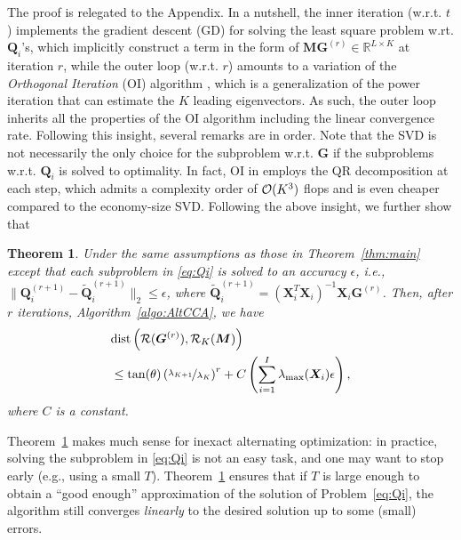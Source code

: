 \documentclass[10pt,journal]{IEEEtran}
\newtheorem{Theorem}{Theorem}
\newtheorem{Remark}{Remark}
\newcommand{\G}{\boldsymbol{G}}
\newcommand{\Q}{\boldsymbol{Q}}
\newcommand{\X}{\boldsymbol{X}}
\begin{document}
The proof is relegated to the Appendix. In a nutshell, the inner iteration (w.r.t. $t$) implements the gradient descent (GD) for solving the least square problem w.rt. $\Q_i$'s, which implicitly construct a term in the form of ${\bm M}{\bm G}^{(r)}\in\mathbb{R}^{L\times K}$ at iteration $r$, while the outer loop (w.r.t. $r$) amounts to a variation of the \emph{Orthogonal Iteration} (OI) algorithm  \cite{GHGolub1996}, which is a generalization of the power iteration that can estimate the $K$ leading eigenvectors.
As such, the outer loop inherits all the properties of the OI algorithm including the linear convergence rate. Following this insight, several remarks are in order.
Note that the SVD is not necessarily the only choice for the subproblem w.r.t. ${\bm G}$ if the subproblems w.r.t. ${\bm Q}_i$ is solved to optimality. In fact, OI in \cite{GHGolub1996} employs the QR decomposition at each step, which admits a complexity order of ${\cal O}(K^3)$ flops and is even cheaper compared to the economy-size SVD.
Following the above insight, we further show that
\begin{Theorem} \label{thm:main_2}
Under the same assumptions as those in Theorem~\ref{thm:main} except that each subproblem in \eqref{eq:Qi} is solved to an accuracy $\epsilon$, i.e., $\|\Q_i^{(r+1)}-\tilde{\Q}_i^{(r+1)}\|_2 \leq \epsilon$, where $\tilde{\Q}_i^{(r+1)}=(\X_i^T\X_i)^{-1}\X_i\G^{(r)}$. Then, after $r$ iterations, Algorithm~\eqref{algo:AltCCA}, we have
\begin{align}
   &{\rm dist}\left({\cal R}({\bm G}^{(r)}),{\cal R}_K({\bm M})\right) \nonumber\\
   &\leq \tan(\theta)\left(\nicefrac{\lambda_{K+1}}{\lambda_K}\right)^r + C\left(\sum_{i=1}^I\lambda_{\max}(\X_i)\epsilon\right) ,
\end{align}
where $C$ is a constant.
\end{Theorem}
Theorem~\ref{thm:main_2} makes much sense for inexact alternating optimization: in practice, solving the subproblem in \eqref{eq:Qi} is not an easy task, and one may want to stop early (e.g., using a small $T$).
Theorem~\ref{thm:main_2} ensures that if $T$ is large enough to obtain a ``good enough'' approximation
of the solution of Problem~\eqref{eq:Qi}, the algorithm still converges \textit{linearly} to the desired solution up to some (small) errors.
%
\end{document}
